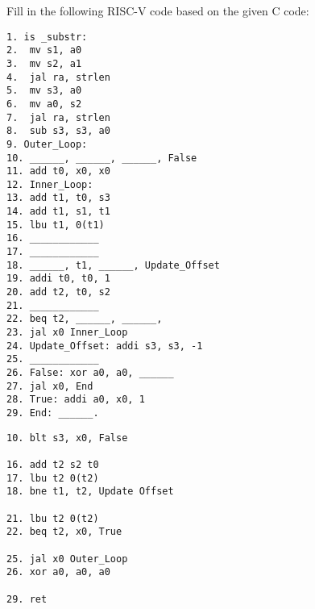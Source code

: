 \begin{blocksection}
\question
Fill in the following RISC-V code based on the given C code:

\begin{verbatim}
1. is _substr:
2. 	mv s1, a0
3. 	mv s2, a1
4. 	jal ra, strlen
5. 	mv s3, a0
6. 	mv a0, s2
7. 	jal ra, strlen
8. 	sub s3, s3, a0
9. Outer_Loop:
10. ______, ______, ______, False
11. add t0, x0, x0
12. Inner_Loop:
13. add t1, t0, s3
14. add t1, s1, t1
15. lbu t1, 0(t1)
16. ____________
17. ____________
18. ______, t1, ______, Update_Offset
19. addi t0, t0, 1
20. add t2, t0, s2
21. ____________
22. beq t2, ______, ______,
23. jal x0 Inner_Loop
24. Update_Offset: addi s3, s3, -1
25. ____________
26. False: xor a0, a0, ______
27. jal x0, End
28. True: addi a0, x0, 1
29. End: ______.
\end{verbatim}

\begin{solution}
\begin{verbatim}
10. blt s3, x0, False

16. add t2 s2 t0
17. lbu t2 0(t2)
18. bne t1, t2, Update Offset

21. lbu t2 0(t2)
22. beq t2, x0, True

25. jal x0 Outer_Loop
26. xor a0, a0, a0

29. ret
\end{verbatim}
\end{solution}

\end{blocksection}